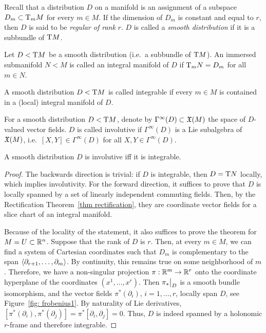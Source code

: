 Recall that a distribution $D$ on a manifold is an assignment of a subspace $D_m\subset \mathrm{T}_m M$ for every $m\in M$. If the dimension of $D_m$ is constant and equal to $r$, then $D$ is said to be \emph{regular of rank} $r$. $D$ is called a \emph{smooth distribution} if it is a subbundle of $\mathrm{T} M$.

\begin{defn}
    Let $D< \mathrm{T} M$ be a smooth distribution (i.e.\ a subbundle of $\mathrm{T} M$). An immersed submanifold $N<M$ is called an integral manifold of $D$ if $\mathrm{T}_m N=D_m$ for all $m\in N$.
\end{defn}

\begin{defn}
    A smooth distribution $D< \mathrm{T} M$ is called integrable if every $m\in M$ is contained in a (local) integral manifold of $D$.
\end{defn}

\begin{defn}
    For a smooth distribution $D< \mathrm{T} M$, denote by $\Gamma^\infty(D)\subset\mathfrak{X}(M)$ the space of $D$-valued vector fields. $D$ is called involutive if $\Gamma^\infty(D)$ is a Lie subalgebra of $\mathfrak{X}(M)$, i.e.\ $[X,Y]\in\Gamma^\infty(D)$ for all $X,Y\in\Gamma^\infty(D)$.
\end{defn}

\begin{thm}\label{thm frobenius}
    A smooth distribution $D$ is involutive iff it is integrable.
\end{thm}
\begin{proof}
    The backwards direction is trivial: if $D$ is integrable, then $D=\mathrm{T} N$ locally, which implies involutivity.
    For the forward direction, it suffices to prove that $D$ is locally spanned by a set of linearly independent commuting fields. Then, by the Rectification Theorem~\ref{thm rectification}, they are coordinate vector fields for a slice chart of an integral manifold.

    Because of the locality of the statement, it also suffices to prove the theorem for $M=U\subset \mathbb{R}^n$. Suppose that the rank of $D$ is $r$. Then, at every $m\in M$, we can find a system of Cartesian coordinates such that $D_m$ is complementary to the span $\langle\partial_{r+1},\ldots,\partial_m\rangle$. By continuity, this remains true on some neighborhood of $m$. Therefore, we have a non-singular projection $\pi:\mathbb{R}^m\to\mathbb{R}^r$ onto the coordinate hyperplane of the coordinates $(x^1,\ldots,x^r)$. Then $\restr{\pi_\ast}{D}$ is a smooth bundle isomorphism, and the vector fields $\pi^\ast(\partial_i)$, $i=1,\ldots,r$, locally span $D$, see Figure~\ref{fig: frobenius1}. By naturality of Lie derivatives, $[\pi^\ast(\partial_i),\pi^\ast(\partial_j)]=\pi^\ast[\partial_i,\partial_j]=0.$
    Thus, $D$ is indeed spanned by a holonomic $r$-frame and therefore integrable.
\end{proof}

